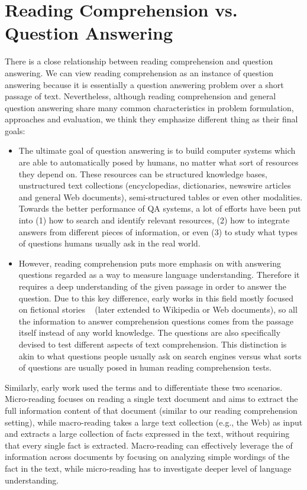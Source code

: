 
\section{Reading Comprehension vs. Question Answering}
\label{sec:rc-qa-diff}

There is a close relationship between reading comprehension and question answering.  We can view reading comprehension as an instance of question answering because it is essentially a question answering problem over a short passage of text. Nevertheless, although reading comprehension and general question answering share many common characteristics in problem formulation, approaches and evaluation, we think they emphasize different thing as their final goals:

\begin{itemize}
    \item
        The ultimate goal of question answering is to build computer systems which are able to automatically  posed by humans, no matter what sort of resources they depend on. These resources can be structured knowledge bases, unstructured text collections (encyclopedias, dictionaries, newswire articles and general Web documents), semi-structured tables or even other modalities. Towards the better performance of QA systems, a lot of efforts have been put into (1) how to search and identify relevant resources, (2) how to integrate answers from different pieces of information, or even (3) to study what types of questions humans usually ask in the real world.
    \item
        However, reading comprehension puts more emphasis on  with answering questions regarded as a way to measure language understanding. Therefore it requires a deep understanding of the given passage in order to answer the question. Due to this key difference, early works in this field mostly focused on fictional stories ~\cite{lehnert1977process} (later extended to Wikipedia or Web documents), so all the information to answer comprehension questions comes from the passage itself instead of any world knowledge. The questions are also specifically devised to test different aspects of text comprehension. This distinction is akin to what questions people usually ask on search engines versus what sorts of questions are usually posed in human reading comprehension tests.
\end{itemize}

Similarly, early work \cite{mitchell2009populating} used the terms  and  to differentiate these two scenarios. Micro-reading focuses on reading a single text document and aims to extract the full information content of that document (similar to our reading comprehension setting), while macro-reading takes a large text collection (e.g., the Web) as input and extracts a large collection of facts expressed in the text, without requiring that every single fact is extracted. Macro-reading can effectively leverage the  of information across documents by focusing on analyzing simple wordings of the fact in the text, while micro-reading has to investigate deeper level of language understanding.

